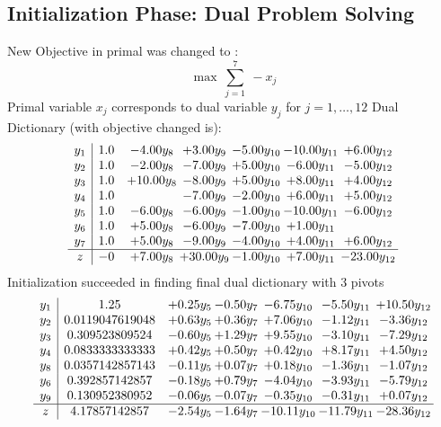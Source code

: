 \documentclass[8pt]{article}
\begin{document}
\subsection{Initialization Phase: Dual Problem Solving}
New Objective in primal was changed to : \[ \max\ \sum_{j=1}^{7}\ - x_j \] 
Primal variable $x_j$ corresponds to dual variable $y_j$ for $j = 1,\ldots,12$
Dual Dictionary (with objective changed is): 
\[\begin{array}{c| c c@{\hskip 2pt} c@{\hskip 2pt} c@{\hskip 2pt} c@{\hskip 2pt} c@{\hskip 2pt} }
 y_{1}   &  1.0 & -4.00 y_{8} & +  3.00 y_{9} & -5.00 y_{10} & -10.00 y_{11} & +  6.00 y_{12}\\
 y_{2}   &  1.0 & -2.00 y_{8} & -7.00 y_{9} & +  5.00 y_{10} & -6.00 y_{11} & -5.00 y_{12}\\
 y_{3}   &  1.0 & + 10.00 y_{8} & -8.00 y_{9} & +  5.00 y_{10} & +  8.00 y_{11} & +  4.00 y_{12}\\
 y_{4}   &  1.0  &   & -7.00 y_{9} & -2.00 y_{10} & +  6.00 y_{11} & +  5.00 y_{12}\\
 y_{5}   &  1.0 & -6.00 y_{8} & -6.00 y_{9} & -1.00 y_{10} & -10.00 y_{11} & -6.00 y_{12}\\
 y_{6}   &  1.0 & +  5.00 y_{8} & -6.00 y_{9} & -7.00 y_{10} & +  1.00 y_{11} &   \\
 y_{7}   &  1.0 & +  5.00 y_{8} & -9.00 y_{9} & -4.00 y_{10} & +  4.00 y_{11} & +  6.00 y_{12}\\
\hline
z    &  -0 & +  7.00 y_{8} & + 30.00 y_{9} & -1.00 y_{10} & +  7.00 y_{11} & -23.00 y_{12}\\
\end{array}\]
Initialization succeeded in finding final dual dictionary with 3 pivots
\[\begin{array}{c| c c@{\hskip 2pt} c@{\hskip 2pt} c@{\hskip 2pt} c@{\hskip 2pt} c@{\hskip 2pt} }
 y_{1}   &  1.25 & +  0.25 y_{5} & -0.50 y_{7} & -6.75 y_{10} & -5.50 y_{11} & + 10.50 y_{12}\\
 y_{2}   &  0.0119047619048 & +  0.63 y_{5} & +  0.36 y_{7} & +  7.06 y_{10} & -1.12 y_{11} & -3.36 y_{12}\\
 y_{3}   &  0.309523809524 & -0.60 y_{5} & +  1.29 y_{7} & +  9.55 y_{10} & -3.10 y_{11} & -7.29 y_{12}\\
 y_{4}   &  0.0833333333333 & +  0.42 y_{5} & +  0.50 y_{7} & +  0.42 y_{10} & +  8.17 y_{11} & +  4.50 y_{12}\\
 y_{8}   &  0.0357142857143 & -0.11 y_{5} & +  0.07 y_{7} & +  0.18 y_{10} & -1.36 y_{11} & -1.07 y_{12}\\
 y_{6}   &  0.392857142857 & -0.18 y_{5} & +  0.79 y_{7} & -4.04 y_{10} & -3.93 y_{11} & -5.79 y_{12}\\
 y_{9}   &  0.130952380952 & -0.06 y_{5} & -0.07 y_{7} & -0.35 y_{10} & -0.31 y_{11} & +  0.07 y_{12}\\
\hline
z    &  4.17857142857 & -2.54 y_{5} & -1.64 y_{7} & -10.11 y_{10} & -11.79 y_{11} & -28.36 y_{12}\\
\end{array}\]
\end{document}
